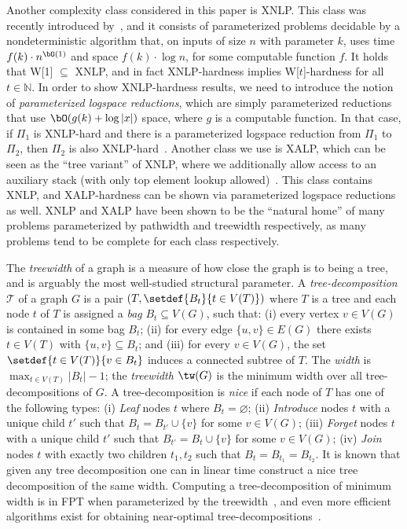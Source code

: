 \documentclass[11pt,letterpaper]{article}
\begin{document}
\begin{toappendix}
Another complexity class considered in this paper is XNLP.
This class was recently introduced by~\cite{iandc/BodlaenderGNS24},
and it consists of parameterized problems decidable by a nondeterministic algorithm that,
on inputs of size $n$ with parameter $k$, uses time $f(k) \cdot n^{\bO(1)}$ and space
$f(k) \cdot \log n$, for some computable function $f$.
It holds that W[1] $\subseteq$ XNLP,
and in fact XNLP-hardness implies W[$t$]-hardness for all $t \in \mathbb{N}$.
In order to show XNLP-hardness results, we need to introduce the notion of
\emph{parameterized logspace reductions}, which are simply
parameterized reductions that use $\bO(g(k) + \log |x|)$ space,
where $g$ is a computable function.
In that case, if $\Pi_1$ is XNLP-hard and there is a parameterized logspace reduction from $\Pi_1$ to $\Pi_2$,
then $\Pi_2$ is also XNLP-hard~\cite{iandc/BodlaenderGNS24}.
Another class we use is XALP, which can be seen as the ``tree variant'' of XNLP,
where we additionally allow access to an auxiliary stack (with only top element lookup allowed)~\cite{iwpec/BodlaenderGJPP22}.
This class contains XNLP, and XALP-hardness can be shown via parameterized logspace reductions as well.
XNLP and XALP have been shown to be the ``natural home'' of many problems parameterized by pathwidth and treewidth respectively,
as many problems tend to be complete for each class respectively.

The \emph{treewidth} of a graph is a measure of how close the graph is to being a tree, and is arguably the most well-studied structural parameter.
A \emph{tree-decomposition} $\mathcal{T}$ of a graph $G$ is a pair $(T,\setdef{B_t}{t \in V(T)})$ where
$T$ is a tree and each node $t$ of $T$ is assigned a \emph{bag} $B_t \subseteq V(G)$,
such that: (i) every vertex $v \in V(G)$ is contained in some bag $B_t$; (ii) for every edge $\{u,v\} \in E(G)$ there exists $t \in V(T)$ with
$\{u,v\} \subseteq B_t$; and
(iii) for every $v \in V(G)$, the set $\setdef{t \in V(T)}{v \in B_t}$ induces a connected subtree of $T$.
The \emph{width} is $\max_{t \in V(T)} |B_t|-1$;
the \emph{treewidth} $\tw(G)$ is the minimum width over all tree-decompositions of $G$.
A tree-decomposition is \emph{nice} if each node of $T$ has one of the following types:
(i) \emph{Leaf} nodes $t$ where $B_t = \varnothing$;
(ii) \emph{Introduce} nodes $t$ with a unique child $t'$ such that $B_t = B_{t'} \cup \{v\}$ for some $v \in V(G)$;
(iii) \emph{Forget} nodes $t$ with a unique child $t'$ such that $B_{t'} = B_t \cup \{v\}$ for some $v \in V(G)$;
(iv) \emph{Join} nodes $t$ with exactly two children $t_1,t_2$ such that $B_t = B_{t_1} = B_{t_2}$.
It is known that given any tree
decomposition one can in linear time construct a nice tree decomposition of the same width.
Computing a tree-decomposition of minimum width is in FPT when parameterized by the treewidth~\cite{siamcomp/Bodlaender96,books/Kloks94,stoc/KorhonenL23},
and even more efficient algorithms exist for obtaining near-optimal tree-decompositions~\cite{focs/Korhonen21}.




\end{toappendix}
\end{document}
